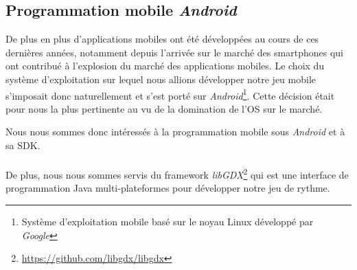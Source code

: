 \subsection{Programmation mobile \textit{Android}}

De plus en plus d'applications mobiles ont été développées au cours de ces dernières années, notamment depuis l'arrivée sur le marché des smartphones qui ont contribué à l'explosion du marché des applications mobiles. Le choix du système d'exploitation sur lequel nous allions développer notre jeu mobile s'imposait donc naturellement et s'est porté sur \textit{Android}\footnote{Système d'exploitation mobile basé sur le noyau Linux développé par \textit{Google}}. Cette décision était pour nous la plus pertinente au vu de la domination de l'OS sur le marché.

Nous nous sommes donc intéressés à la programmation mobile sous \textit{Android} et à sa SDK.

\paragraph{}
De plus, nous nous sommes servis du framework \textit{libGDX}\footnote{\url{https://github.com/libgdx/libgdx}} qui est une interface de programmation Java multi-plateformes pour développer notre jeu de rythme.